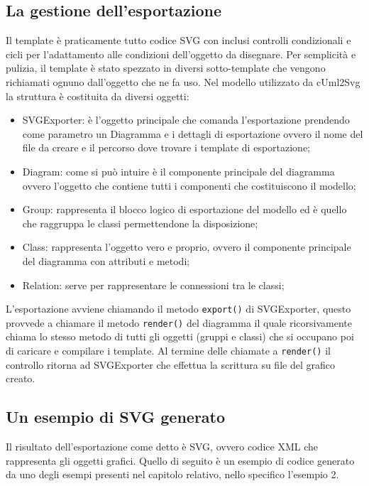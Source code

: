 \subsection{La gestione dell'esportazione}
Il template è praticamente tutto codice SVG con inclusi controlli condizionali e
cicli per l'adattamento alle condizioni dell'oggetto da disegnare. Per
semplicità e pulizia, il template è stato spezzato in diversi sotto-template che
vengono richiamati ognuno dall'oggetto che ne fa uso.
Nel modello utilizzato da cUml2Svg la struttura è costituita da diversi oggetti:
\begin{itemize}
  \item SVGExporter: è l'oggetto principale che comanda l'esportazione prendendo
  come parametro un Diagramma e i dettagli di esportazione ovvero il nome del
  file da creare e il percorso dove trovare i template di esportazione;
  \item Diagram: come si può intuire è il componente principale del diagramma
  ovvero l'oggetto che contiene tutti i componenti che costituiscono il modello;
  \item Group: rappresenta il blocco logico di esportazione del modello ed è
  quello che raggruppa le classi permettendone la disposizione;
  \item Class: rappresenta l'oggetto vero e proprio, ovvero il componente
  principale del diagramma con attributi e metodi;
  \item Relation: serve per rappresentare le connessioni tra le classi;
\end{itemize}
L'esportazione avviene chiamando il metodo \lstinline{export()} di SVGExporter,
questo provvede a chiamare il metodo \lstinline{render()} del diagramma il quale
ricorsivamente chiama lo stesso metodo di tutti gli oggetti (gruppi e classi)
che si occupano poi di caricare e compilare i template.
Al termine delle chiamate a \lstinline{render()} il controllo ritorna ad
SVGExporter che effettua la scrittura su file del grafico creato.

\subsection{Un esempio di SVG generato}
Il risultato dell'esportazione come detto è SVG, ovvero codice XML che
rappresenta gli oggetti grafici. Quello di seguito è un esempio di codice
generato da uno degli esempi presenti nel capitolo relativo, nello specifico
l'esempio 2.

